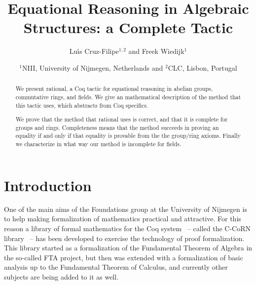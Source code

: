 \documentclass{article}
\newcommand{\N}{{\cal N}}
\newcommand{\tacticname}[1]{\textsf{#1}}
\newcommand{\rational}{\tacticname{rational}}
\newcommand{\axiom}[1]{\ensuremath{\mathbf{#1}}}
\begin{document}
\title{\Large Equational Reasoning in Algebraic Structures: a Complete Tactic}
\author{Lu\'\i s Cruz-Filipe$^{1,2}$ and Freek Wiedijk$^1$}
\date{$^1$NIII, University of Nijmegen, Netherlands and $^2$CLC, Lisbon, Portugal}
\maketitle

\begin{abstract}
We present {\rational}, a Coq tactic for equational reasoning
in abelian groups, commutative rings, and fields.
We give an mathematical description of the method that
this tactic uses, which abstracts from Coq specifics.

We prove that the method that {\rational} uses is correct,
and that it is complete for groups and rings.
Completeness means that the method succeeds in
proving an equality if and only if that equality is provable from
the the group/ring axioms.
Finally we characterize in what way our method is incomplete for
fields.
\end{abstract}

\tableofcontents

%


\section{Introduction}


One of the main aims of the Foundations group at the University of
Nijmegen is to help making formalization of mathematics practical and
attractive.
For this reason a library of formal mathematics for the Coq
system~\cite{coqmanual} -- called the C-CoRN
library~\cite{lcf:geu:wie:04} -- has been developed to exercise the
technology of proof formalization.
This library started as a formalization of the Fundamental Theorem of
Algebra in the so-called FTA project, but then was extended with a
formalization of basic analysis up to the Fundamental Theorem of
Calculus, and currently other subjects are being added to it as well.
\end{document}
